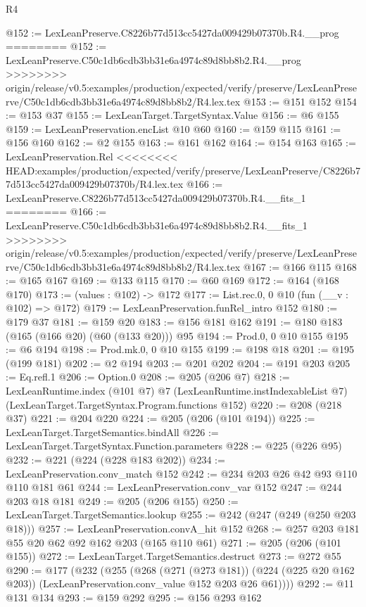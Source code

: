 \begin{lexlean}{R4}
\begin{coremodule}
{{{{{{{{@152 := LexLeanPreserve.C8226b77d513cc5427da009429b07370b.R4.__prog
========
@152 := LexLeanPreserve.C50c1db6cdb3bb31e6a4974c89d8bb8b2.R4.__prog
>>>>>>>> origin/release/v0.5:examples/production/expected/verify/preserve/LexLeanPreserve/C50c1db6cdb3bb31e6a4974c89d8bb8b2/R4.lex.tex
@153 := @151 @152
@154 := @153 @37
@155 := LexLeanTarget.TargetSyntax.Value
@156 := @6 @155
@159 := LexLeanPreservation.encList @10 @60
@160 := @159 @115
@161 := @156 @160
@162 := @2 @155
@163 := @161 @162
@164 := @154 @163
@165 := LexLeanPreservation.Rel
<<<<<<<< HEAD:examples/production/expected/verify/preserve/LexLeanPreserve/C8226b77d513cc5427da009429b07370b/R4.lex.tex
@166 := LexLeanPreserve.C8226b77d513cc5427da009429b07370b.R4.__fits_1
========
@166 := LexLeanPreserve.C50c1db6cdb3bb31e6a4974c89d8bb8b2.R4.__fits_1
>>>>>>>> origin/release/v0.5:examples/production/expected/verify/preserve/LexLeanPreserve/C50c1db6cdb3bb31e6a4974c89d8bb8b2/R4.lex.tex
@167 := @166 @115
@168 := @165 @167
@169 := @133 @115
@170 := @60 @169
@172 := @164 (@168 @170)
@173 := (values : @102) -> @172
@177 := List.rec.{0, 0} @10 (fun (__v : @102) => @172)
@179 := LexLeanPreservation.funRel_intro @152
@180 := @179 @37
@181 := @159 @20
@183 := @156 @181 @162
@191 := @180 @183 (@165 (@166 @20) (@60 (@133 @20))) @95
@194 := Prod.{0, 0} @10 @155
@195 := @6 @194
@198 := Prod.mk.{0, 0} @10 @155
@199 := @198 @18
@201 := @195 (@199 @181)
@202 := @2 @194
@203 := @201 @202
@204 := @191 @203
@205 := Eq.refl.{1}
@206 := Option.{0}
@208 := @205 (@206 @7)
@218 := LexLeanRuntime.index
    (@101 @7)
    @7
    (LexLeanRuntime.instIndexableList @7)
    (LexLeanTarget.TargetSyntax.Program.functions @152)
@220 := @208 (@218 @37)
@221 := @204 @220
@224 := @205 (@206 (@101 @194))
@225 := LexLeanTarget.TargetSemantics.bindAll
@226 := LexLeanTarget.TargetSyntax.Function.parameters
@228 := @225 (@226 @95)
@232 := @221 (@224 (@228 @183 @202))
@234 := LexLeanPreservation.conv_match @152
@242 := @234 @203 @26 @42 @93 @110 @110 @181 @61
@244 := LexLeanPreservation.conv_var @152
@247 := @244 @203 @18 @181
@249 := @205 (@206 @155)
@250 := LexLeanTarget.TargetSemantics.lookup
@255 := @242 (@247 (@249 (@250 @203 @18)))
@257 := LexLeanPreservation.convA_hit @152
@268 := @257 @203 @181 @55 @20 @62 @92 @162 @203 (@165 @110 @61)
@271 := @205 (@206 (@101 @155))
@272 := LexLeanTarget.TargetSemantics.destruct
@273 := @272 @55
@290 := @177
    (@232
      (@255
        (@268
          (@271 (@273 @181))
          (@224 (@225 @20 @162 @203))
          (LexLeanPreservation.conv_value @152 @203 @26 @61))))
@292 := @11 @131 @134
@293 := @159 @292
@295 := @156 @293 @162
}}}}}}}}
\end{coremodule}
\end{lexlean}
